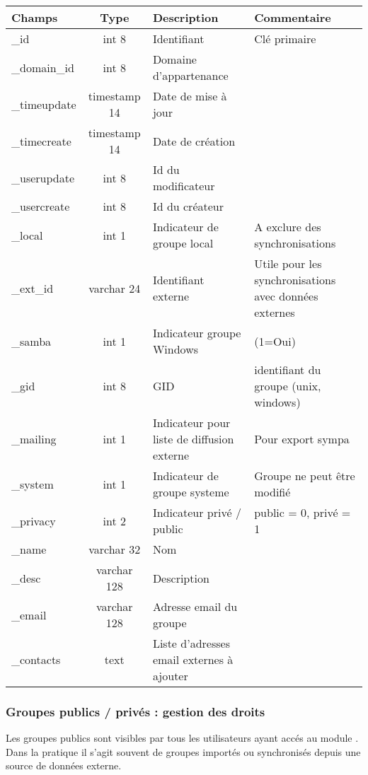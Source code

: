 \begin{tabular}{|p{3cm}|c|p{5.4cm}|p{2.6cm}|}
\hline
\textbf{Champs} & \textbf{Type} & \textbf{Description} & \textbf{Commentaire} \\
\hline
\_id & int 8 & Identifiant & Clé primaire \\
\hline
\_domain\_id & int 8 & Domaine d'appartenance & \\
\hline
\_timeupdate & timestamp 14 & Date de mise à jour & \\
\hline
\_timecreate & timestamp 14 & Date de création & \\
\hline
\_userupdate & int 8 & Id du modificateur & \\
\hline
\_usercreate & int 8 & Id du créateur & \\
\hline
\_local & int 1 & Indicateur de groupe local & A exclure des synchronisations \\
\hline
\_ext\_id & varchar 24 & Identifiant externe & Utile pour les synchronisations avec données externes\\
\hline
\_samba & int 1 & Indicateur groupe Windows & (1=Oui) \\
\hline
\_gid & int 8 & GID & identifiant du groupe (unix, windows) \\
\hline
\_mailing & int 1 & Indicateur pour liste de diffusion externe & Pour export sympa \\
\hline
\_system & int 1  & Indicateur de groupe systeme & Groupe ne peut être modifié \\
\hline
\_privacy & int 2  & Indicateur privé / public & public = 0, privé = 1\\
\hline
\_name & varchar 32 & Nom & \\
\hline
\_desc & varchar 128 & Description  & \\
\hline
\_email & varchar 128 & Adresse email du groupe & \\
\hline
\_contacts & text & Liste d'adresses email externes à ajouter & \\
\hline
\end{tabular}

\subsubsection{Groupes publics / privés : gestion des droits}

Les groupes publics sont visibles par tous les utilisateurs ayant accés au module \group.
Dans la pratique il s'agit souvent de groupes importés ou synchronisés depuis une source de données externe.


